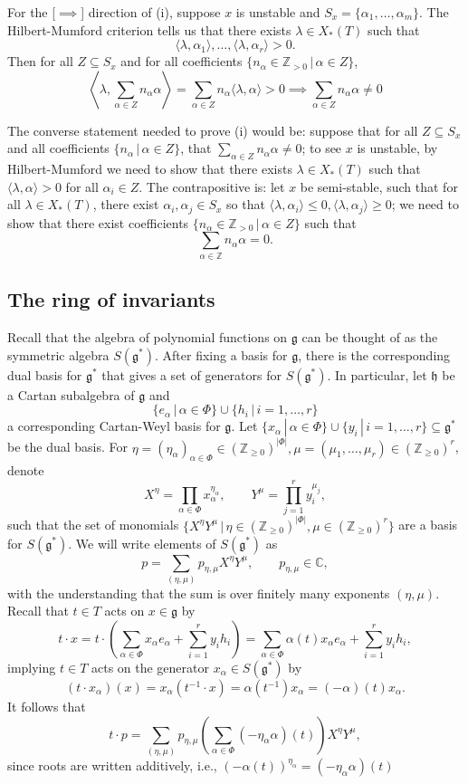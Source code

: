 \documentclass[12pt]{amsart}
\newcommand{\C}{\mathbb{C}}
\newcommand{\Z}{\mathbb{Z}}
\newcommand{\g}{\mathfrak{g}}
\newcommand{\h}{\mathfrak{h}}
\theoremstyle{remark}
\theoremstyle{remark}
\theoremstyle{remark}
\begin{document}
For the [$\implies$] direction of (i), suppose $x$ is unstable and $S_x = \{\alpha_1, \ldots, \alpha_m\}$.
The Hilbert-Mumford criterion tells us that there exists $\lambda \in X_*(T)$ such that 
$$\langle \lambda, \alpha_1 \rangle, \ldots, \langle \lambda, \alpha_r \rangle > 0.$$
Then for all $Z \subseteq S_x$ and for all coefficients $\{n_\alpha \in \Z_{>0} \, | \, \alpha \in Z\}$,
$$\left\langle\lambda, \sum_{\alpha \in Z}  n_\alpha  \alpha \right \rangle
= \sum_{\alpha \in Z} n_\alpha  \langle \lambda, \alpha \rangle > 0 \implies \sum_{\alpha \in Z}  n_\alpha  \alpha \ne 0$$

The converse statement needed to prove (i) would be: 
suppose that for all $Z \subseteq S_x$ and all coefficients $\{n_\alpha \, | \, \alpha \in Z\}$, that $\sum_{\alpha \in Z} n_\alpha \alpha \ne 0$; to see $x$ is unstable, by Hilbert-Mumford we need to show that there exists $\lambda \in X_*(T)$ such that $\langle \lambda, \alpha \rangle > 0$ for all $\alpha_i \in Z$.
The contrapositive is: 
let $x$ be semi-stable, such that for all $\lambda \in X_*(T)$, there exist $\alpha_i, \alpha_j \in S_x$ so that $\langle \lambda, \alpha_i \rangle \le 0, \langle \lambda, \alpha_j \rangle \ge 0$; 
we need to show that there exist coefficients $\{n_\alpha \in \mathbb{Z}_{>0} \, | \, \alpha \in Z\}$ such that 
$$\sum_{\alpha \in \Z} n_\alpha \alpha = 0.$$

\subsection{The ring of invariants}
Recall that the algebra of polynomial functions on $\g$ can be thought of as the symmetric algebra $S(\g^*)$.
After fixing a basis for $\g$, there is the corresponding dual basis for $\g^*$ that gives a set of generators for $S(\g^*)$.
In particular, let $\h$ be a Cartan subalgebra of $\g$ and 
$$\{e_\alpha \, | \, \alpha \in \Phi\}\cup\{h_i \, | \, i=1,\ldots, r\}$$
a corresponding Cartan-Weyl basis for $\g$.
Let $\{x_\alpha\,|\,\alpha\in\Phi\}\cup\{y_i\,|\,i=1,\ldots,r\}\subseteq\g^*$ be the dual basis.
For $\eta = (\eta_\alpha)_{\alpha\in\Phi} \in (\Z_{\ge0})^{|\Phi|}, \mu = (\mu_1, \ldots, \mu_r)\in (\Z_{\ge0})^r$, denote
$$X^\eta = \prod_{\alpha\in\Phi} x_{\alpha}^{\eta_\alpha}, \qquad Y^\mu = \prod_{j=1}^r y_i^{\mu_j},$$
such that the set of monomials $\{X^\eta Y^\mu\,|\,\eta \in (\Z_{\ge0})^{|\Phi|}, \mu\in(\Z_{\ge0})^r\}$ are a basis for $S(\g^*)$.
We will write elements of $S(\g^*)$ as 
$$p = \sum_{(\eta, \mu)} p_{\eta,\mu} X^\eta Y^\mu, \qquad p_{\eta,\mu} \in \C,$$
with the understanding that the sum is over finitely many exponents $(\eta, \mu)$.
Recall that $t \in T$ acts on $x \in \g$ by
$$t \cdot x = t \cdot \left(\sum_{\alpha\in\Phi} x_\alpha e_\alpha + \sum_{i=1}^r y_i h_i \right) = \sum_{\alpha\in\Phi} \alpha(t) x_\alpha e_\alpha + \sum_{i=1}^r y_i h_i,$$
implying $t \in T$ acts on the generator $x_\alpha \in S(\g^*)$ by
$$(t\cdot x_\alpha)(x) = x_\alpha(t^{-1} \cdot x) = \alpha(t^{-1}) x_\alpha = (-\alpha)(t) x_\alpha.$$
It follows that 
$$t \cdot p = \sum_{(\eta, \mu)} p_{\eta,\mu} \left(\sum_{\alpha\in\Phi} (- \eta_\alpha \alpha)(t)\right) X^\eta Y^\mu,$$
since roots are written additively, i.e., $(-\alpha(t))^{\eta_\alpha} = (-\eta_\alpha \alpha)(t)$
\end{document}
